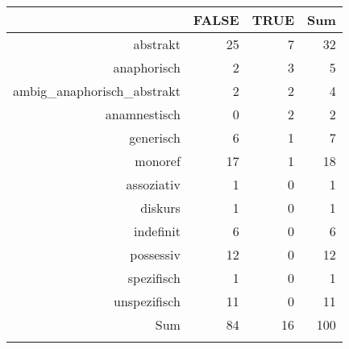 \begin{tabular}{rrrr}
  \lsptoprule
 & FALSE & TRUE & Sum \\ 
  \midrule
abstrakt & 25 & 7 & 32 \\ 
  anaphorisch & 2 & 3 & 5 \\ 
  ambig\_anaphorisch\_abstrakt & 2 & 2 & 4 \\ 
  anamnestisch & 0 & 2 & 2 \\ 
  generisch & 6 & 1 & 7 \\ 
  monoref & 17 & 1 & 18 \\ 
  assoziativ & 1 & 0 & 1 \\ 
  diskurs & 1 & 0 & 1 \\ 
  indefinit & 6 & 0 & 6 \\ 
  possessiv & 12 & 0 & 12 \\ 
  spezifisch & 1 & 0 & 1 \\ 
  unspezifisch & 11 & 0 & 11 \\ 
  Sum & 84 & 16 & 100 \\ 
   \lspbottomrule
\end{tabular}
